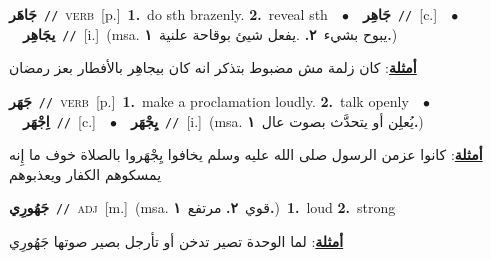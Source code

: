 \documentclass[10pt,a4paper,twoside]{article} %
\begin{document}
\begin{multicols}{2}
{\setlength\topsep{0pt}\textbf{\foreignlanguage{arabic}{جَاهَر}}\ {\color{gray}\texttt{//}\color{black}}\ \textsc{verb}\ [p.]\ \textbf{1.}~do sth brazenly.  \textbf{2.}~reveal sth\ \ $\bullet$\ \ \setlength\topsep{0pt}\textbf{\foreignlanguage{arabic}{جَاهِر}}\ {\color{gray}\texttt{//}\color{black}}\ [c.]\ \ $\bullet$\ \ \setlength\topsep{0pt}\textbf{\foreignlanguage{arabic}{يجَاهِر}}\ {\color{gray}\texttt{//}\color{black}}\ [i.]\ \color{gray}(msa. \foreignlanguage{arabic}{يبوح بشيء}~\foreignlanguage{arabic}{\textbf{٢.}}  .\foreignlanguage{arabic}{يفعل شيئ بوقاحة علنية}~\foreignlanguage{arabic}{\textbf{١.}})\color{black}\  \begin{flushright}\color{gray}\foreignlanguage{arabic}{\textbf{\underline{\foreignlanguage{arabic}{أمثلة}}}: كان زلمة مش مضبوط بتذكر انه كان بيجاهِر بالأفطار بعز رمضان}\end{flushright}\color{black}} \vspace{2mm}

{\setlength\topsep{0pt}\textbf{\foreignlanguage{arabic}{جَهَر}}\ {\color{gray}\texttt{//}\color{black}}\ \textsc{verb}\ [p.]\ \textbf{1.}~make a proclamation loudly.  \textbf{2.}~talk openly\ \ $\bullet$\ \ \setlength\topsep{0pt}\textbf{\foreignlanguage{arabic}{اِجْهَر}}\ {\color{gray}\texttt{//}\color{black}}\ [c.]\ \ $\bullet$\ \ \setlength\topsep{0pt}\textbf{\foreignlanguage{arabic}{يِجْهَر}}\ {\color{gray}\texttt{//}\color{black}}\ [i.]\ \color{gray}(msa. \foreignlanguage{arabic}{يُعلِن أو يتحدَّث بصوت عال}~\foreignlanguage{arabic}{\textbf{١.}})\color{black}\  \begin{flushright}\color{gray}\foreignlanguage{arabic}{\textbf{\underline{\foreignlanguage{arabic}{أمثلة}}}: كانوا عزمن الرسول صلى الله عليه وسلم يخافوا يِجْهَروا بالصلاة خوف ما إِنه يمسكوهم الكفار ويعذبوهم}\end{flushright}\color{black}} \vspace{2mm}

{\setlength\topsep{0pt}\textbf{\foreignlanguage{arabic}{جَهُورِي}}\ {\color{gray}\texttt{//}\color{black}}\ \textsc{adj}\ [m.]\ \color{gray}(msa. \foreignlanguage{arabic}{قوي}~\foreignlanguage{arabic}{\textbf{٢.}}  \foreignlanguage{arabic}{مرتفع}~\foreignlanguage{arabic}{\textbf{١.}})\color{black}\ \textbf{1.}~loud  \textbf{2.}~strong\  \begin{flushright}\color{gray}\foreignlanguage{arabic}{\textbf{\underline{\foreignlanguage{arabic}{أمثلة}}}: لما الوحدة تصير تدخن أو تأرجل بصير صوتها جَهُورِي}\end{flushright}\color{black}} \vspace{2mm}


\end{multicols}
\end{document}

